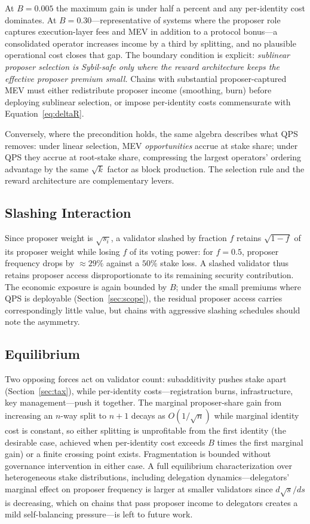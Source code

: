 \documentclass[11pt,a4paper]{article}
\begin{document}
At $B = 0.005$ the maximum gain is under half a percent and any per-identity cost dominates. At $B = 0.30$---representative of systems where the proposer role captures execution-layer fees and MEV in addition to a protocol bonus---a consolidated operator increases income by a third by splitting, and no plausible operational cost closes that gap. The boundary condition is explicit: \emph{sublinear proposer selection is Sybil-safe only where the reward architecture keeps the effective proposer premium small.} Chains with substantial proposer-captured MEV must either redistribute proposer income (smoothing, burn) before deploying sublinear selection, or impose per-identity costs commensurate with Equation~\eqref{eq:deltaR}.

Conversely, where the precondition holds, the same algebra describes what QPS removes: under linear selection, MEV \emph{opportunities} accrue at stake share; under QPS they accrue at root-stake share, compressing the largest operators' ordering advantage by the same $\sqrt{k}$ factor as block production. The selection rule and the reward architecture are complementary levers.

\subsection{Slashing Interaction}
\label{sec:slashing}

Since proposer weight is $\sqrt{s_i}$, a validator slashed by fraction $f$ retains $\sqrt{1-f}$ of its proposer weight while losing $f$ of its voting power: for $f = 0.5$, proposer frequency drops by $\approx 29\%$ against a $50\%$ stake loss. A slashed validator thus retains proposer access disproportionate to its remaining security contribution. The economic exposure is again bounded by $B$; under the small premiums where QPS is deployable (Section~\ref{sec:scope}), the residual proposer access carries correspondingly little value, but chains with aggressive slashing schedules should note the asymmetry.

\subsection{Equilibrium}
\label{sec:equilibrium}

Two opposing forces act on validator count: subadditivity pushes stake apart (Section~\ref{sec:tax}), while per-identity costs---registration burns, infrastructure, key management---push it together. The marginal proposer-share gain from increasing an $n$-way split to $n+1$ decays as $O(1/\sqrt{n})$ while marginal identity cost is constant, so either splitting is unprofitable from the first identity (the desirable case, achieved when per-identity cost exceeds $B$ times the first marginal gain) or a finite crossing point exists. Fragmentation is bounded without governance intervention in either case. A full equilibrium characterization over heterogeneous stake distributions, including delegation dynamics---delegators' marginal effect on proposer frequency is larger at smaller validators since $d\sqrt{s}/ds$ is decreasing, which on chains that pass proposer income to delegators creates a mild self-balancing pressure---is left to future work.
\end{document}
